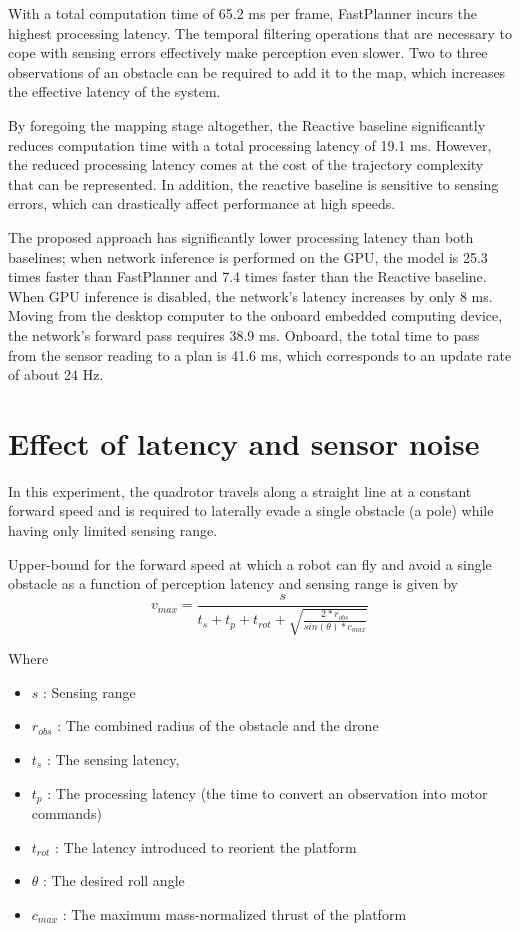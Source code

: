 With a total computation time of 65.2 ms per frame, FastPlanner incurs the highest processing latency. The
temporal filtering operations that are necessary to cope with sensing errors effectively make perception even slower. Two to three observations
of an obstacle can be required to add it to the map, which increases
the effective latency of the system. 

By foregoing the mapping stage
altogether, the Reactive baseline significantly reduces computation
time with a total processing latency of 19.1 ms. However, the reduced processing
latency comes at the cost of the trajectory complexity that can be represented. In addition, the reactive baseline is sensitive to sensing errors,
which can drastically affect performance at high speeds.
 

The proposed approach has significantly lower processing latency than both
baselines; when network inference is performed on the GPU, the model is 25.3 times faster than FastPlanner and 7.4 times faster
than the Reactive baseline. When GPU inference is disabled, the
network’s latency increases by only 8 ms. Moving from the desktop computer
to the onboard embedded computing device, the network’s forward
pass requires 38.9 ms. Onboard, the total time to pass from the sensor
reading to a plan is 41.6 ms, which corresponds to an update rate of about 24 Hz.



\section{Effect of latency and sensor noise}
In this experiment, the quadrotor travels along a
straight line at a constant forward speed and is required to laterally
evade a single obstacle (a pole) while having only limited sensing
range. 

Upper-bound for the forward speed at which a robot can
fly and avoid a single obstacle as a function of perception latency and
sensing range is given by
\begin{equation}
	v_{max} = \frac{s}{t_s + t_p + t_{rot} + \sqrt{\frac{2*r_{obs}}{sin(\theta)*c_{max}}}}
\end{equation}

Where
\begin{itemize}
	\item $s$ : Sensing range
	\item $r_{obs}$ : The combined radius of the obstacle and the drone
	\item $t_s$ : The sensing latency,
	\item $t_p$ : The processing
latency (the time to convert an observation into motor commands)
	\item $t_{rot}$ : The latency introduced to reorient the platform
	\item $\theta$ : The desired roll angle
	\item $c_{max}$ : The maximum mass-normalized thrust of the platform
\end{itemize}

